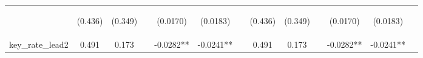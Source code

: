 \documentclass[]{article}
\begin{document}
\begin{center}
\begin{tabular}{lcccccccccccc}
\vspace{4pt} & \begin{footnotesize}(0.436)\end{footnotesize} & \begin{footnotesize}(0.349)\end{footnotesize} & \begin{footnotesize}\end{footnotesize} & \begin{footnotesize}(0.0170)\end{footnotesize} & \begin{footnotesize}(0.0183)\end{footnotesize} & \begin{footnotesize}\end{footnotesize} & \begin{footnotesize}(0.436)\end{footnotesize} & \begin{footnotesize}(0.349)\end{footnotesize} & \begin{footnotesize}\end{footnotesize} & \begin{footnotesize}(0.0170)\end{footnotesize} & \begin{footnotesize}(0.0183)\end{footnotesize} & \begin{footnotesize}\end{footnotesize} \\
key\_rate\_lead2 & 0.491 & 0.173 &  & -0.0282** & -0.0241** &  & 0.491 & 0.173 &  & -0.0282** & -0.0241** &  \\

\end{tabular}
\end{center}
\end{document}
